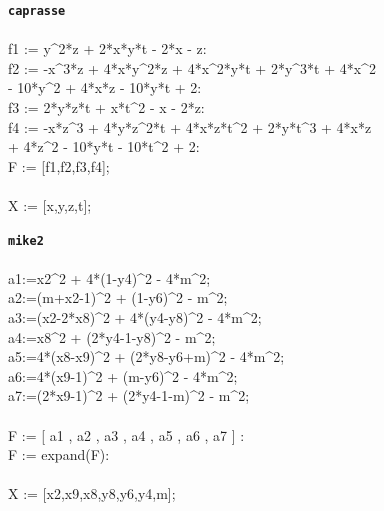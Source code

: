 \documentclass[letterpaper,12pt,titlepage,oneside,final]{book}
\newenvironment{codefont}{\footnotesize\ttfamily}{\par}
\begin{document}
\begin{appendices}
\noindent\textbf{\texttt{caprasse}}\\\\
\noindent\begin{codefont}
 f1 := y\^{}2*z + 2*x*y*t - 2*x - z:\\
f2 := -x\^{}3*z + 4*x*y\^{}2*z + 4*x\^{}2*y*t + 2*y\^{}3*t + 4*x\^{}2\\
      - 10*y\^{}2 + 4*x*z - 10*y*t + 2:\\
f3 := 2*y*z*t + x*t\^{}2 - x - 2*z:\\
f4 := -x*z\^{}3 + 4*y*z\^{}2*t + 4*x*z*t\^{}2 + 2*y*t\^{}3 + 4*x*z \\
      + 4*z\^{}2 - 10*y*t - 10*t\^{}2 + 2:\\
F := [f1,f2,f3,f4];\\
\\
X := [x,y,z,t];\\
\end{codefont}

\noindent\textbf{\texttt{mike2}}\\\\
\noindent\begin{codefont}
 a1:=x2\^{}2 + 4*(1-y4)\^{}2 - 4*m\^{}2;\\
a2:=(m+x2-1)\^{}2 + (1-y6)\^{}2 - m\^{}2;\\
a3:=(x2-2*x8)\^{}2 + 4*(y4-y8)\^{}2 - 4*m\^{}2;\\
a4:=x8\^{}2 + (2*y4-1-y8)\^{}2 - m\^{}2;\\
a5:=4*(x8-x9)\^{}2 + (2*y8-y6+m)\^{}2 - 4*m\^{}2;\\
a6:=4*(x9-1)\^{}2 + (m-y6)\^{}2 - 4*m\^{}2;\\
a7:=(2*x9-1)\^{}2 + (2*y4-1-m)\^{}2 - m\^{}2;\\
\\
F := [ a1 , a2 , a3 , a4 , a5 , a6 , a7 ] :\\
F := expand(F):\\
\\
X := [x2,x9,x8,y8,y6,y4,m];\\
\end{codefont}


\end{appendices}
\end{document}
